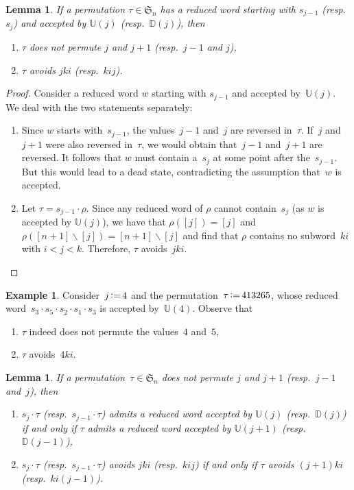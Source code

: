 \documentclass[11pt]{article}
\newtheorem{lemma}[theo]{Lemma}
\theoremstyle{definition}
\newtheorem{example}[theo]{Example}
\numberwithin{equation}{section}
\newcommand{\fS}{\mathfrak{S}}
\newcommand{\ssm}{\smallsetminus}
\newcommand{\eqdef}{\mbox{\,\raisebox{0.2ex}{\scriptsize\ensuremath{\mathrm:}}\ensuremath{=}\,}}
\newcommand{\automatonU}{\mathbb{U}}
\newcommand{\automatonD}{\mathbb{D}}
\begin{document}
\begin{lemma}\label{lem:vincent3}
If a permutation $\tau \in \fS_n$ has a reduced word starting with $s_{j-1}$ (resp.~$s_j$) and accepted by $\automatonU(j)$ (resp.~$\automatonD(j)$), then
\begin{enumerate} 
	\item $\tau$ does not permute $j$ and $j+1$ (resp.~$j-1$ and $j$),
	\item $\tau$ avoids $jki$ (resp.~$kij$).
\end{enumerate}
\end{lemma}

\pagebreak
\begin{proof}
Consider a reduced word $w$ starting with $s_{j-1}$ and accepted by~$\automatonU(j)$. 
We deal with the two statements separately:
\begin{enumerate} 
	\item Since $w$ starts with~$s_{j-1}$, the values~$j-1$ and~$j$ are reversed in~$\tau$. If~$j$ and~$j+1$ were also reversed in~$\tau$, we would obtain that~$j-1$ and~$j+1$ are reversed. It follows that $w$ must contain a~$s_j$ at some point after the~$s_{j-1}$. But this would lead to a dead state, contradicting the assumption that~$w$ is accepted.
	\item Let $\tau = s_{j-1}\cdot \rho$. Since any reduced word of $\rho$ cannot contain~$s_j$ (as $w$ is accepted by $\automatonU(j)$), we have that $\rho([j]) = [j]$ and $\rho([n+1] \ssm [j]) = [n+1] \ssm [j]$ and find that $\rho$ contains no subword~$ki$ with $i < j < k$. Therefore, $\tau$ avoids~$jki$.
	\qedhere
\end{enumerate}
\end{proof}

\begin{example}\label{exm:lemVincent3}
Consider~$j \eqdef 4$ and the permutation~$\tau \eqdef 413265$, whose reduced word~$s_3 \cdot s_5 \cdot s_2 \cdot s_1 \cdot s_3$ is accepted by~$\automatonU(4)$.
Observe that
\begin{enumerate}
	\item $\tau$ indeed does not permute the values~$4$ and~$5$,
	\item $\tau$ avoids~$4ki$.
\end{enumerate}
\end{example}

\begin{lemma}\label{lem:vincent4}
If a permutation~$\tau \in \fS_n$ does not permute $j$ and $j+1$ (resp.~$j-1$ and~$j$), then
\begin{enumerate} 
	\item $s_j \cdot \tau$ (resp.~$s_{j-1} \cdot \tau$) admits a reduced word accepted by $\automatonU(j)$ (resp.~$\automatonD(j)$) if and only if $\tau$ admits a reduced word accepted by $\automatonU(j+1)$ (resp.~$\automatonD(j-1)$),
	\item $s_j \cdot \tau$ (resp.~$s_{j-1} \cdot \tau$) avoids $jki$ (resp.~$kij$) if and only if $\tau$ avoids $(j+1)ki$ (resp.~$ki(j-1)$).
\end{enumerate}
\end{lemma}
\end{document}

